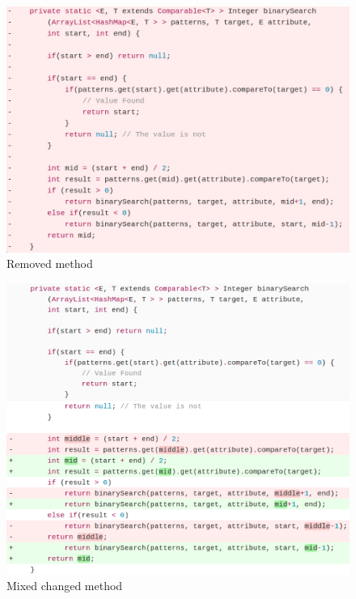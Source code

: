 \begin{figure}[!ht]
    \centering
        \includegraphics[width=1.0\textwidth]{images/deleted_method}
    \caption{Removed method}
    \label{fig:removed_method}
\end{figure}

\begin{figure}[!ht]
    \centering
        \includegraphics[width=1.0\textwidth]{images/simple_complex}
    \caption{Mixed changed method}
    \label{fig:changed_method}
\end{figure}

